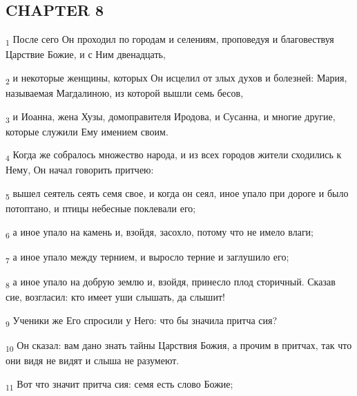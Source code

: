 \subsection{CHAPTER 8}
\begin{tcolorbox}
\textsubscript{1} После сего Он проходил по городам и селениям, проповедуя и благовествуя Царствие Божие, и с Ним двенадцать,
\end{tcolorbox}
\begin{tcolorbox}
\textsubscript{2} и некоторые женщины, которых Он исцелил от злых духов и болезней: Мария, называемая Магдалиною, из которой вышли семь бесов,
\end{tcolorbox}
\begin{tcolorbox}
\textsubscript{3} и Иоанна, жена Хузы, домоправителя Иродова, и Сусанна, и многие другие, которые служили Ему имением своим.
\end{tcolorbox}
\begin{tcolorbox}
\textsubscript{4} Когда же собралось множество народа, и из всех городов жители сходились к Нему, Он начал говорить притчею:
\end{tcolorbox}
\begin{tcolorbox}
\textsubscript{5} вышел сеятель сеять семя свое, и когда он сеял, иное упало при дороге и было потоптано, и птицы небесные поклевали его;
\end{tcolorbox}
\begin{tcolorbox}
\textsubscript{6} а иное упало на камень и, взойдя, засохло, потому что не имело влаги;
\end{tcolorbox}
\begin{tcolorbox}
\textsubscript{7} а иное упало между тернием, и выросло терние и заглушило его;
\end{tcolorbox}
\begin{tcolorbox}
\textsubscript{8} а иное упало на добрую землю и, взойдя, принесло плод сторичный. Сказав сие, возгласил: кто имеет уши слышать, да слышит!
\end{tcolorbox}
\begin{tcolorbox}
\textsubscript{9} Ученики же Его спросили у Него: что бы значила притча сия?
\end{tcolorbox}
\begin{tcolorbox}
\textsubscript{10} Он сказал: вам дано знать тайны Царствия Божия, а прочим в притчах, так что они видя не видят и слыша не разумеют.
\end{tcolorbox}
\begin{tcolorbox}
\textsubscript{11} Вот что значит притча сия: семя есть слово Божие;
\end{tcolorbox}
